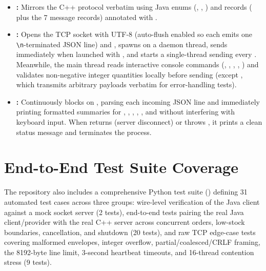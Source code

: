 \documentclass{../latex/utmreport}
\begin{document}
\begin{itemize}
  \item \textbf{:} Mirrors the C++ protocol verbatim using Java enums (, , ) and records ( plus the 7 message records) annotated with \allowbreak{}.
  \item \textbf{:} Opens the TCP socket with UTF-8  (auto-flush enabled so each  emits one \texttt{\textbackslash n}-terminated JSON line) and , spawns  on a daemon thread, sends  immediately when launched with , and starts a single-thread  sending  every . Meanwhile, the main thread reads interactive console commands (, , , , ) and validates non-negative integer quantities locally before sending (except , which transmits arbitrary payloads verbatim for error-handling tests).
  \item \textbf{:} Continuously blocks on , parsing each incoming JSON line and immediately printing formatted summaries for , , , , , and  without interfering with keyboard input. When  returns  (server disconnect) or throws , it prints a clean status message and terminates the process.
\end{itemize}

\section{End-to-End Test Suite Coverage}
The repository also includes a comprehensive Python test suite () defining 31 automated test cases across three groups: wire-level verification of the Java client against a mock socket server (2 tests), end-to-end tests pairing the real Java client/provider with the real C++ server across concurrent orders, low-stock boundaries,  cancellation, and shutdown (20 tests), and raw TCP edge-case tests covering malformed envelopes, integer overflow, partial/coalesced/CRLF framing, the 8192-byte line limit, 3-second heartbeat timeouts, and 16-thread contention stress (9 tests).
\end{document}

